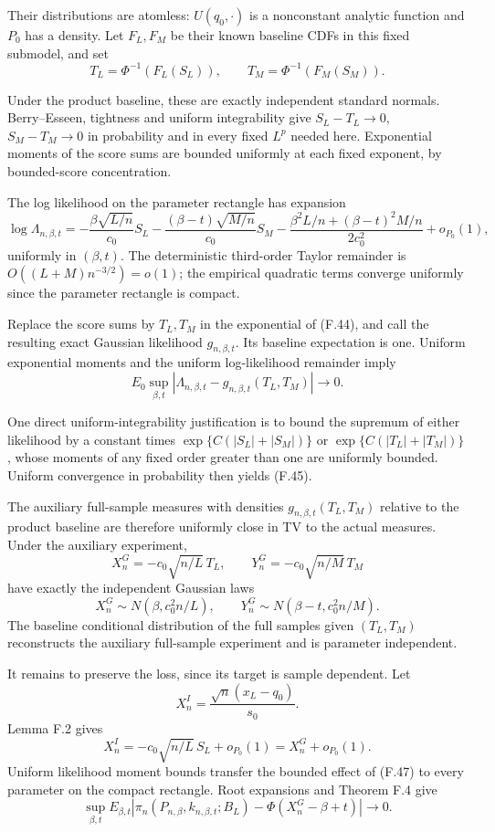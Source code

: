 Their distributions are atomless: \(U(q_0,\cdot)\) is a nonconstant
analytic function and \(P_0\) has a density. Let \(F_L,F_M\) be their
known baseline CDFs in this fixed submodel, and set \[
T_L=\Phi^{-1}(F_L(S_L)),\qquad
T_M=\Phi^{-1}(F_M(S_M)).
\]

Under the product baseline, these are exactly independent standard
normals. Berry--Esseen, tightness and uniform integrability give
\(S_L-T_L\to0\), \(S_M-T_M\to0\) in probability and in every fixed
\(L^p\) needed here. Exponential moments of the score sums are bounded
uniformly at each fixed exponent, by bounded-score concentration.

The log likelihood on the parameter rectangle has expansion \[
\log\Lambda_{n,\beta,t}
=-\frac{\beta\sqrt{L/n}}{c_0}S_L
 -\frac{(\beta-t)\sqrt{M/n}}{c_0}S_M
 -\frac{\beta^2L/n+(\beta-t)^2M/n}{2c_0^2}
 +o_{P_0}(1),
\tag{F.44}
\] uniformly in \((\beta,t)\). The deterministic third-order Taylor
remainder is \(O((L+M)n^{-3/2})=o(1)\); the empirical quadratic terms
converge uniformly since the parameter rectangle is compact.

Replace the score sums by \(T_L,T_M\) in the exponential of (F.44), and
call the resulting exact Gaussian likelihood \(g_{n,\beta,t}\). Its
baseline expectation is one. Uniform exponential moments and the uniform
log-likelihood remainder imply \[
E_0\sup_{\beta,t}
|\Lambda_{n,\beta,t}-g_{n,\beta,t}(T_L,T_M)|
\longrightarrow0.
\tag{F.45}
\]

One direct uniform-integrability justification is to bound the supremum
of either likelihood by a constant times \(\exp\{C(|S_L|+|S_M|)\}\) or
\(\exp\{C(|T_L|+|T_M|)\}\), whose moments of any fixed order greater
than one are uniformly bounded. Uniform convergence in probability then
yields (F.45).

The auxiliary full-sample measures with densities
\(g_{n,\beta,t}(T_L,T_M)\) relative to the product baseline are
therefore uniformly close in TV to the actual measures. Under the
auxiliary experiment, \[
X_n^G=-c_0\sqrt{n/L}\,T_L,\qquad
Y_n^G=-c_0\sqrt{n/M}\,T_M
\] have exactly the independent Gaussian laws \[
X_n^G\sim N(\beta,c_0^2n/L),\qquad
Y_n^G\sim N(\beta-t,c_0^2n/M).
\tag{F.46}
\] The baseline conditional distribution of the full samples given
\((T_L,T_M)\) reconstructs the auxiliary full-sample experiment and is
parameter independent.

It remains to preserve the loss, since its target is sample dependent.
Let \[
X_n^I=\frac{\sqrt n(x_L-q_0)}{s_0}.
\] Lemma F.2 gives \[
X_n^I=-c_0\sqrt{n/L}\,S_L+o_{P_0}(1)
      =X_n^G+o_{P_0}(1).
\tag{F.47}
\] Uniform likelihood moment bounds transfer the bounded effect of
(F.47) to every parameter on the compact rectangle. Root expansions and
Theorem F.4 give \[
\sup_{\beta,t}E_{\beta,t}
\left|\pi_n(P_{n,\beta},k_{n,\beta,t};B_L)
 -\Phi(X_n^G-\beta+t)\right|\longrightarrow0.
\tag{F.48}
\]

